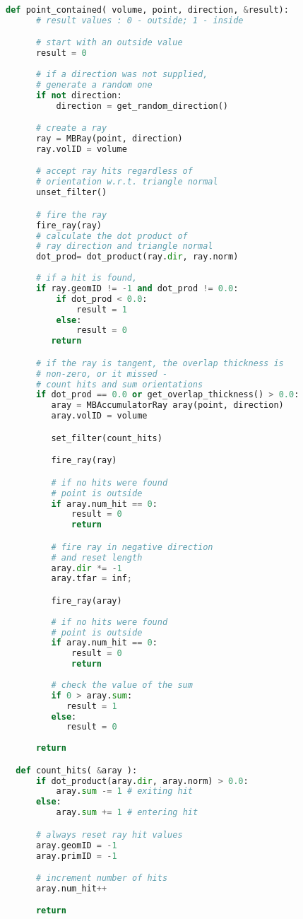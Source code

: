 \begin{lstlisting}[language=Python,basicstyle=\tiny]
  def point_contained( volume, point, direction, &result):
      # result values : 0 - outside; 1 - inside

      # start with an outside value
      result = 0
  
      # if a direction was not supplied,
      # generate a random one
      if not direction:
          direction = get_random_direction()

      # create a ray
      ray = MBRay(point, direction)
      ray.volID = volume

      # accept ray hits regardless of
      # orientation w.r.t. triangle normal
      unset_filter()

      # fire the ray
      fire_ray(ray)
      # calculate the dot product of
      # ray direction and triangle normal
      dot_prod= dot_product(ray.dir, ray.norm)
      
      # if a hit is found, 
      if ray.geomID != -1 and dot_prod != 0.0:
          if dot_prod < 0.0:
              result = 1
          else:
              result = 0
         return

      # if the ray is tangent, the overlap thickness is
      # non-zero, or it missed - 
      # count hits and sum orientations
      if dot_prod == 0.0 or get_overlap_thickness() > 0.0:
         aray = MBAccumulatorRay aray(point, direction)
         aray.volID = volume

         set_filter(count_hits)

         fire_ray(ray)

         # if no hits were found
         # point is outside
         if aray.num_hit == 0:
             result = 0
             return

         # fire ray in negative direction
         # and reset length
         aray.dir *= -1
         aray.tfar = inf;

         fire_ray(aray)
         
         # if no hits were found
         # point is outside
         if aray.num_hit == 0:
             result = 0
             return
            
         # check the value of the sum
         if 0 > aray.sum:
            result = 1
         else:
            result = 0
            
      return       

  def count_hits( &aray ):
      if dot_product(aray.dir, aray.norm) > 0.0:
          aray.sum -= 1 # exiting hit
      else:
          aray.sum += 1 # entering hit          

      # always reset ray hit values
      aray.geomID = -1
      aray.primID = -1

      # increment number of hits
      aray.num_hit++

      return
          
\end{lstlisting}

